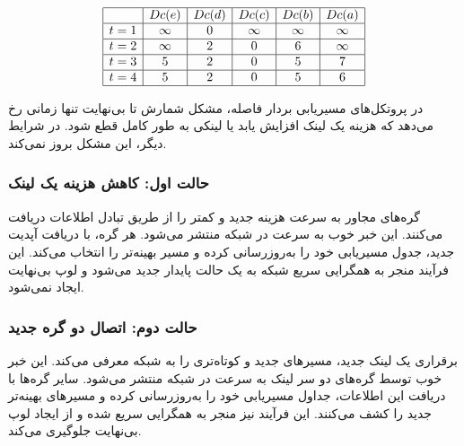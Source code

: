 
\[
\begin{array}{|c|c|c|c|c|c|}
	\hline
	\textbf{} & Dc(e) & Dc(d) & Dc(c) & Dc(b) & Dc(a) \\
	\hline
	t=1 & \infty & 0 & \infty & \infty & \infty \\
	\hline
	t=2 & \infty & 2 & 0 & 6 & \infty \\
	\hline
	t=3 & 5 & 2 & 0 & 5 & 7 \\
	\hline
	t=4 & 5 & 2 & 0 & 5 & 6 \\
	\hline
\end{array}
\]


در پروتکل‌های مسیریابی بردار فاصله، مشکل شمارش تا بی‌نهایت تنها زمانی رخ می‌دهد که هزینه یک لینک {افزایش} یابد یا لینکی به طور کامل {قطع} شود. در شرایط دیگر، این مشکل بروز نمی‌کند.

\subsubsection*{حالت اول: کاهش هزینه یک لینک}

گره‌های مجاور به سرعت هزینه جدید و کمتر را از طریق تبادل اطلاعات دریافت می‌کنند. این خبر خوب به سرعت در شبکه منتشر می‌شود. هر گره، با دریافت آپدیت جدید، جدول مسیریابی خود را به‌روزرسانی کرده و مسیر بهینه‌تر را انتخاب می‌کند. این فرآیند منجر به همگرایی سریع شبکه به یک حالت پایدار جدید می‌شود و لوپ بی‌نهایت ایجاد نمی‌شود.
	

\subsubsection*{حالت دوم: اتصال دو گره جدید}

برقراری یک لینک جدید، مسیرهای جدید و کوتاه‌تری را به شبکه معرفی می‌کند. این خبر خوب توسط گره‌های دو سر لینک به سرعت در شبکه منتشر می‌شود. سایر گره‌ها با دریافت این اطلاعات، جداول مسیریابی خود را به‌روزرسانی کرده و مسیرهای بهینه‌تر جدید را کشف می‌کنند. این فرآیند نیز منجر به همگرایی سریع شده و از ایجاد لوپ بی‌نهایت جلوگیری می‌کند.






